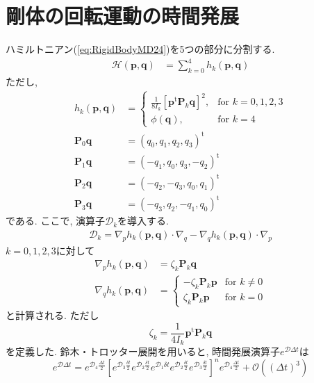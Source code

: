 \section{剛体の回転運動の時間発展}
ハミルトニアン(\ref{eq:RigidBodyMD24})を5つの部分に分割する. 
\begin{align}
 \mathcal{H}(\bm{p}, \bm{q})
 &=
 \sum_{k=0}^{4} h_{k} (\bm{p}, \bm{q})
\end{align}
ただし, 
\begin{align}
 h_{k} (\bm{p}, \bm{q}) &=
 \begin{cases}
  \frac{1}{8 I_{k}} [\bm{p}^{\mathrm{t}}\bm{P}_{k}\bm{q}]^{2}, &\text{for $k=0,1,2,3$} \\
  \phi(\bm{q}),& \text{for $k=4$}
 \end{cases}
 \\
  \bm{P}_{0} \bm{q}
 &= (q_{0}, q_{1}, q_{2}, q_{3})^{\mathrm{t}}
  \\
 \bm{P}_{1} \bm{q}
 &= (-q_{1}, q_{0}, q_{3}, -q_{2})^{\mathrm{t}}
  \\
 \bm{P}_{2} \bm{q}
 &= (-q_{2}, -q_{3}, q_{0}, q_{1})^{\mathrm{t}}
  \\
 \bm{P}_{3} \bm{q}
 &= (-q_{3}, q_{2}, -q_{1}, q_{0})^{\mathrm{t}}
\end{align}
である. ここで, 演算子$\mathcal{D}_{k}$を導入する. 
\begin{align}
 \mathcal{D}_{k}
 =
 \nabla_{p} h_{k} (\bm{p},\bm{q}) \cdot \nabla_{q}
 -
 \nabla_{q} h_{k} (\bm{p},\bm{q}) \cdot \nabla_{p}
\end{align}
$k=0,1,2,3$に対して
\begin{align}
 \nabla_{p} h_{k} (\bm{p},\bm{q})
 &=
  \zeta_{k} \bm{P}_{k} \bm{q}
 \\
 \nabla_{q} h_{k} (\bm{p},\bm{q})
 &=
 \begin{cases}
  -  \zeta_{k} \bm{P}_{k} \bm{p} &\text{for $k \neq 0$} \\
     \zeta_{k} \bm{P}_{k} \bm{p} &\text{for $k =    0$} 
 \end{cases}
\end{align}
と計算される. ただし
\begin{equation}
 \zeta_{k} = \frac{1}{4I_{k}}
  \bm{p}^{\mathrm{t}} \bm{P}_{k} \bm{q}
\end{equation}
を定義した. 
鈴木・トロッター展開を用いると, 時間発展演算子$e^{\mathcal{D} \Delta t}$は
\begin{equation}
 e^{\mathcal{D} \Delta t}
  =
  e^{\mathcal{D}_{4} \frac{\Delta t}{2}}
  \left[
   e^{\mathcal{D}_{3} \frac{\delta t}{2}}
   e^{\mathcal{D}_{2} \frac{\delta t}{2}}
   e^{\mathcal{D}_{1} \delta t}
   e^{\mathcal{D}_{2} \frac{\delta t}{2}}
   e^{\mathcal{D}_{3} \frac{\delta t}{2}}
  \right]^{n}
  e^{\mathcal{D}_{4} \frac{\Delta t}{2}}
  +
  \mathcal{O}\left( (\Delta t)^{3}\right)
\end{equation}
